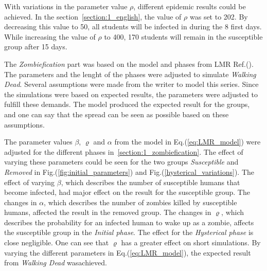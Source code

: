 \documentclass[%
twoside,                 %
final,                   %
chapterprefix=true,      %
open=right               %
10pt]{book}
\begin{document}
\vspace{3mm}




\vspace{3mm}


With variations in the parameter value $\rho$, different epidemic results could be achieved. In the section~\ref{section:1_english}, the value of $\rho$ was set to 202. By decreasing this value to 50, all students will be infected in during the 8 first days. While increasing the value of $\rho$ to 400, 170 students will remain in the susceptible group after 15 days. 


\vspace{3mm}




\vspace{3mm}


The \emph{Zombiefication} part was based on the model and phases from LMR Ref.(\cite{zombie-math}). The parameters and the lenght of the phases were adjusted to simulate \emph{Walking Dead}. Several assumptions were made from the writer to model this series. Since the simulations were based on expected results, the parameters were adjusted to fulfill these demands. The model produced the expected result for the groups, and one can say that the spread can be seen as possible based on these assumptions.    


\vspace{3mm}




\vspace{3mm}


The parameter values $\beta$, $\varrho$ and $\alpha$ from the model in Eq.(\ref{eq:LMR_model}) were adjusted for the different phases in~\ref{section:1_zombiefication}. The effect of varying these parameters could be seen for the two groups \emph{Susceptible} and \emph{Removed} in Fig.(\ref{fig:initial_parameters}) and Fig.(\ref{hysterical_variations}). The effect of varying $\beta$, which describes the number of susceptible humans that become infected, had major effect on the result for the susceptible group. The changes in $\alpha$, which describes the number of zombies killed by susceptible humans, affected the result in the removed group. The changes in $\varrho$, which describes the probability for an infected human to wake up as a zombie, affects the susceptible group in the \emph{Initial phase}.  The effect for the \emph{Hysterical phase} is close negligible. One can see that $\varrho$ has a greater effect on short simulations. By varying the different parameters in Eq.(\ref{eq:LMR_model}), the expected result from \emph{Walking Dead} wasachieved.
\end{document}
